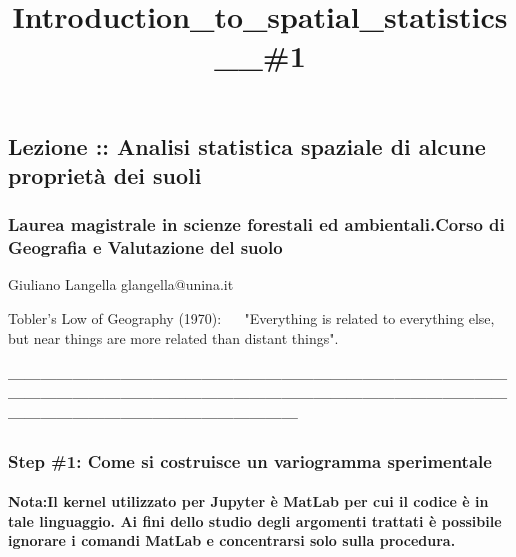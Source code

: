 \documentclass[11pt]{article}
\title{Introduction\_to\_spatial\_statistics\_\_\#1}
\begin{document}
    
    
    \maketitle
    
    

    
    \subsection{Lezione :: Analisi statistica spaziale di alcune proprietà
dei
suoli}\label{lezione-analisi-statistica-spaziale-di-alcune-proprietuxe0-dei-suoli}

    \subsubsection{\texorpdfstring{Laurea magistrale in scienze forestali ed
ambientali.Corso di Geografia e Valutazione del
suolo}{Laurea magistrale in scienze forestali ed ambientali. Corso di Geografia e Valutazione del suolo}}\label{laurea-magistrale-in-scienze-forestali-ed-ambientali.-corso-di-geografia-e-valutazione-del-suolo}

    Giuliano Langella glangella@unina.it

Tobler's Low of Geography (1970): \(\quad\) "Everything is related to
everything else, but near things are more related than distant things".

    \paragraph{------------------------------------------------------------------------------------------------------------------------------------------------------------------------------------------------------------------------------------------------}\label{section}

    \subsubsection{Step \#1: Come si costruisce un variogramma
sperimentale}\label{step-1-come-si-costruisce-un-variogramma-sperimentale}

\paragraph{\texorpdfstring{Nota:Il kernel utilizzato per Jupyter è
MatLab per cui il codice è in tale linguaggio. Ai fini dello studio
degli argomenti trattati è possibile ignorare i comandi MatLab e
concentrarsi solo sulla
procedura.}{Nota: Il kernel utilizzato per Jupyter è MatLab per cui il codice è in tale linguaggio.  Ai fini dello studio degli argomenti trattati è possibile ignorare i comandi MatLab e concentrarsi solo sulla procedura.}}\label{nota-il-kernel-utilizzato-per-jupyter-uxe8-matlab-per-cui-il-codice-uxe8-in-tale-linguaggio.-ai-fini-dello-studio-degli-argomenti-trattati-uxe8-possibile-ignorare-i-comandi-matlab-e-concentrarsi-solo-sulla-procedura.}
\end{document}
